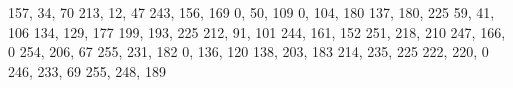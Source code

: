 \documentclass{scrartcl}
\begin{document}
	
	\definecolor{unired1}{RGB}			{157,  34,  70}
	\definecolor{unired2}{RGB}			{213,  12,  47}  %
	\definecolor{unired3}{RGB}			{243, 156, 169}
	\definecolor{uniblue1}{RGB}			{  0,  50, 109}  %
	\definecolor{uniblue2}{RGB}			{  0, 104, 180}
	\definecolor{uniblue3}{RGB}			{137, 180, 225}
	\definecolor{unipurple1}{RGB}		{ 59,  41, 106}
	\definecolor{unipurple2}{RGB}		{134, 129, 177}
	\definecolor{unipurple3}{RGB}		{199, 193, 225}
	\definecolor{unipeach1}{RGB}		{212,  91, 101}
	\definecolor{unipeach2}{RGB}		{244, 161, 152}
	\definecolor{unipeach3}{RGB}		{251, 218, 210}
	\definecolor{uniorange1}{RGB}		{247, 166,   0}
	\definecolor{uniorange2}{RGB}		{254, 206,  67}
	\definecolor{uniorange3}{RGB}		{255, 231, 182}
	\definecolor{unigreen1}{RGB}		{  0, 136, 120}
	\definecolor{unigreen2}{RGB}		{138, 203, 183}
	\definecolor{unigreen3}{RGB}		{214, 235, 225}
	\definecolor{uniyellow1}{RGB}		{222, 220,   0}
	\definecolor{uniyellow2}{RGB}		{246, 233,  69}
	\definecolor{uniyellow3}{RGB}		{255, 248, 189}
	
%	
%	
%	
%	
%	
%	
	
	
%	
%	
%	
%	
\end{document}
